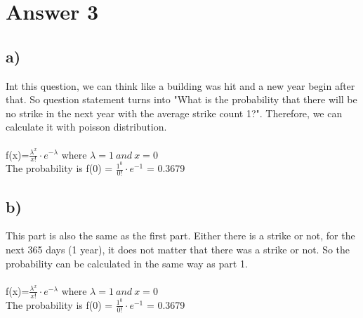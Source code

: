 \documentclass[12pt]{article}
\begin{document}
\newpage
\section*{Answer 3}

\subsection*{a)}\noindent 
Int this question, we can think like a building was hit and a new year begin after that. So question statement turns into "What is the probability that there will be no strike in the next year with the average strike count 1?". Therefore, we can calculate it with poisson distribution.\\\\
f(x)=$\frac{\lambda^x}{x!}\cdot e^{-\lambda}$ where $\lambda = 1\:and\:x=0$\\
The probability is f(0) = $\frac{1^0}{0!}\cdot e^{-1}$ = 0.3679

\subsection*{b)}\noindent
This part is also the same as the first part. Either there is a strike or not, for the next 365 days (1 year), it does not matter that there was a strike or not. So the probability can be calculated in the same way as part 1.\\\\
f(x)=$\frac{\lambda^x}{x!}\cdot e^{-\lambda}$ where $\lambda = 1\:and\:x=0$\\
The probability is f(0) = $\frac{1^0}{0!}\cdot e^{-1}$ = 0.3679
\end{document}
